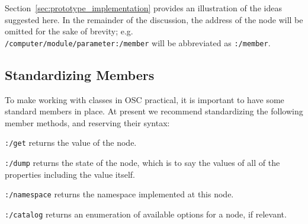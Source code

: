 \documentclass{NIME-alternate}
\newenvironment{packed_item}{
\begin{itemize}
  \setlength{\itemsep}{1pt}
  \setlength{\parskip}{0pt}
  \setlength{\parsep}{0pt}
}{\end{itemize}}
\begin{document}


Section~\ref{sec:prototype_implementation} provides an illustration of the ideas suggested here. In the remainder of the discussion, the address of the node will be omitted for the sake of brevity; e.g.\\ 
\texttt{/computer/module/parameter:/member}  
will be abbreviated as \texttt{:/member}.



\subsection{Standardizing Members} %
\label{sub:standardizing_members}

To make working with classes in OSC practical, it is important to have some standard members in place. At present we recommend standardizing the following member methods, and reserving their syntax:
\begin{packed_item}%
	\item \texttt{:/get} returns the value of the node.
	\item \texttt{:/dump} returns the state of the node, which is to say the values of all of the properties including the value itself.
	\item \texttt{:/namespace} returns the namespace implemented at this node.
	\item \texttt{:/catalog} returns an enumeration of available options for a node, if relevant.
\end{packed_item}%




\end{document}
